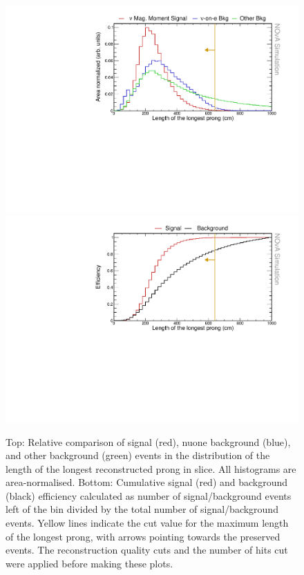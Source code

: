\begin{figure}[hbtp]
\centering
\includegraphics[width=.9\textwidth]{Plots/NuMMEventSelection/N1Cut_longestProng.pdf}
\includegraphics[width=.9\textwidth]{Plots/NuMMEventSelection/NuMM_N1Cut_longestProngleft_Eff.pdf}
\caption[Length of the longest prong cut for pre-selection]{Top: Relative comparison of signal (red), \acrshort{nuone} background (blue), and other background (green) events in the distribution of the length of the longest reconstructed prong in slice. All histograms are area-normalised. Bottom: Cumulative signal (red) and background (black) efficiency calculated as number of signal/background events left of the bin divided by the total number of signal/background events. Yellow lines indicate the cut value for the maximum length of the longest prong, with arrows pointing towards the preserved events. The reconstruction quality cuts and the number of hits cut were applied before making these plots.}
\label{fig:NuMMCutsLongestProng}
\end{figure}

